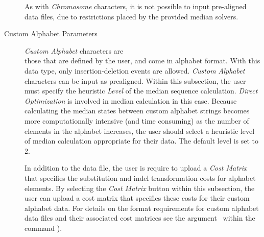 \begin{description}
		As with \emph{Chromosome} characters, it is not possible to input pre-aligned data files, due to 
		restrictions placed by the provided median solvers. 
		
	\item [Custom Alphabet Parameters] \emph{Custom Alphabet} characters are \\those that
		are defined by the user, and come in alphabet format. With this data type, only insertion-deletion 
		events are allowed. \emph{Custom Alphabet} characters can be input as prealigned. Within this 
		subsection, the user must specify the heuristic \emph{Level} of the median sequence calculation.
		\emph{Direct Optimization} is involved in median calculation in this case. Because calculating the median 
		states between custom alphabet strings becomes more computationally intensive (and time 
		consuming) as the number of elements in the alphabet increases, the user should select a heuristic 
		level of median calculation appropriate for their data.  The default level is set to 2.
		
		\indent In addition to the data file, the user is require to upload a \emph {Cost Matrix} that specifies 
		the substitution and indel transformation costs for alphabet elements.  By selecting the 
		\emph {Cost Matrix} button within this subsection, the user can upload a cost matrix that 
		specifies these costs for their custom alphabet data. For details on the format requirements for 
		custom alphabet data files and their associated cost matrices see the 
		argument~ within the command 	).


\end{description}
